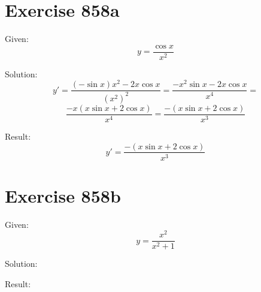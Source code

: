\documentclass[a4paper, 10pt]{scrartcl}
\begin{document}
\section{Exercise 858a}

Given:
\[
y = \frac{\cos{x}}{x^{2}}
\]

Solution:
\[
y' = \frac{(-\sin{x})x^{2} - 2x\cos{x}}{(x^{2})^{2}} = \frac{-x^{2}\sin{x} - 2x\cos{x}}{x^{4}} =
\]
\[
\frac{-x(x\sin{x} + 2\cos{x})}{x^{4}} = \frac{-(x\sin{x} + 2\cos{x})}{x^{3}}
\]

Result:
\[
y' = \frac{-(x\sin{x} + 2\cos{x})}{x^{3}}
\]

\section{Exercise 858b}

Given:
\[
y = \frac{x^{2}}{x^{2} + 1}
\]

Solution:

Result:
\end{document}
